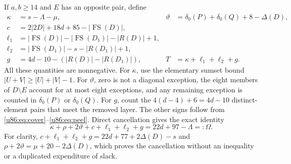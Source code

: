 \documentclass[11pt,a4paper]{article}
\theoremstyle{remark}
\newcommand{\FS}{\operatorname{FS}}
\begin{document}
If $a,b\ge14$ and $E$ has an opposite pair, define
\begin{align*}
 \kappa&=s-\Lambda-\mu,&
 \vartheta&=\delta_0(P)+\delta_0(Q)+8-\Delta(D),\\
 c&=2|2D|+18d+85-|\FS(D)|,\\
 \ell_1&=|\FS(D)|-|\FS(D_1)|-|R(D)|+1,\\
 \ell_2&=|\FS(D_1)|-s-|R(D_1)|+1,\\
 g&=4d-10-(|R(D)|-|R(D_1)|),&
 T&=\kappa+\ell_1+\ell_2+g.
\end{align*}
All these quantities are nonnegative. For $\kappa$, use the elementary
sumset bound $|U+V|\ge|U|+|V|-1$. For $\vartheta$, zero is not a diagonal
exception, the eight members of $D\setminus E$ account for at most eight
exceptions, and any remaining exception is counted in $\delta_0(P)$ or
$\delta_0(Q)$. For $g$, count the $4(d-4)+6=4d-10$ distinct-element pairs
that meet the removed layer. The other signs follow from
\eqref{u86:eq:cover}--\eqref{u86:eq:peel}.
Direct cancellation gives the exact identity
\begin{equation}\label{u86:eq:budget}
 \boxed{\kappa+\rho+2\vartheta+c+\ell_1+\ell_2+g
       =22d+97-\Lambda=:\Omega.}
\end{equation}
For clarity, $c+\ell_1+\ell_2+g=22d+77+2\Delta(D)-s$ and
$\rho+2\vartheta=\mu+20-2\Delta(D)$, which proves the cancellation
without an inequality or a duplicated expenditure of slack.
\end{document}
